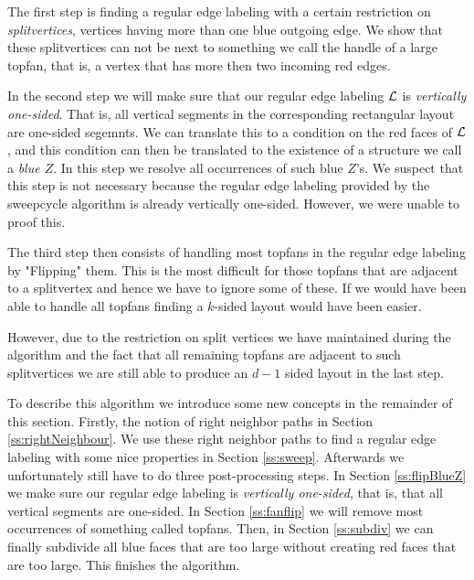   The first step is finding a regular edge labeling with a certain restriction on \emph{splitvertices}, vertices having more than one blue outgoing edge.
  We show that these splitvertices can not be next to something we call the handle of a large topfan, that is, a vertex that has more then two incoming red edges.

  In the second step we will make sure that our regular edge labeling $\mathcal{L}$ is \emph{vertically one-sided}. That is, all vertical segments in the corresponding rectangular layout are one-sided segemnts. We can translate this to a condition on the red faces of $\mathcal{L}$, and this condition can then be translated to the existence of a structure we call a \emph{blue $Z$}. In this step we resolve all occurrences of such blue $Z$'s. We suspect that this step is not necessary because the regular edge labeling provided by the sweepcycle algorithm is already vertically one-sided. However, we were unable to proof this.

  The third step then consists of handling most topfans in the regular edge labeling by "Flipping" them. This is the most difficult for those topfans that are adjacent to a splitvertex and hence we have to ignore some of these. If we would have been able to handle all topfans finding a $k$-sided layout would have been easier.

  However, due to the restriction on split vertices we have maintained during the algorithm and the fact that all remaining topfans are adjacent to such splitvertices we are still able to produce an $d-1$ sided layout in the last step.

  To describe this algorithm we introduce some new concepts in the remainder of this section. Firstly, the notion of right neighbor paths in Section \ref{ss:rightNeighbour}.  We use these right neighbor paths to find a regular edge labeling with some nice properties in Section \ref{ss:sweep}. Afterwards we unfortunately still have to do three post-processing steps. In Section \ref{ss:flipBlueZ} we make sure our regular edge labeling is \emph{vertically one-sided}, that is, that all vertical segments are one-sided. In Section \ref{ss:fanflip} we will remove most occurrences of something called topfans. Then, in Section \ref{ss:subdiv} we can finally subdivide all blue faces that are too large without creating red faces that are too large. This finishes the algorithm.
